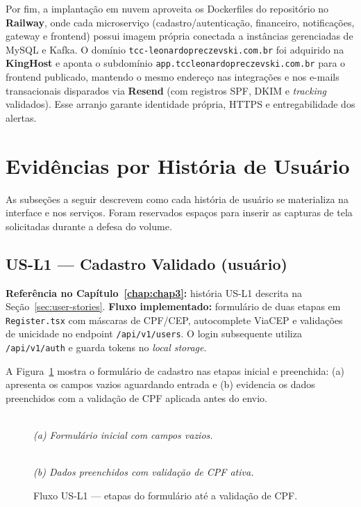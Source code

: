 Por fim, a implantação em nuvem aproveita os Dockerfiles do repositório no \textbf{Railway}, onde cada microserviço (cadastro/autenticação, financeiro, notificações, gateway e frontend) possui imagem própria conectada a instâncias gerenciadas de MySQL e Kafka. O domínio \texttt{tcc-leonardopreczevski.com.br} foi adquirido na \textbf{KingHost} e aponta o subdomínio \texttt{app.tcc\-leonardopreczevski.com.br} para o frontend publicado, mantendo o mesmo endereço nas integrações e nos e-mails transacionais disparados via \textbf{Resend} (com registros SPF, DKIM e \textit{tracking} validados). Esse arranjo garante identidade própria, HTTPS e entregabilidade dos alertas.

\section{Evidências por História de Usuário}

As subseções a seguir descrevem como cada história de usuário se materializa na interface e nos serviços. Foram reservados espaços para inserir as capturas de tela solicitadas durante a defesa do volume.

\subsection{US-L1 — Cadastro Validado (usuário)}
\textbf{Referência no Capítulo~\ref{chap:chap3}:} história US-L1 descrita na Seção~\ref{sec:user-stories}.
\textbf{Fluxo implementado:} formulário de duas etapas em \texttt{Register.tsx} com máscaras de CPF/CEP, autocomplete ViaCEP e validações de unicidade no endpoint \texttt{/api/v1/users}. O login subsequente utiliza \texttt{/api/v1/auth} e guarda tokens no \textit{local storage}.

A Figura~\ref{fig:us-l1a} mostra o formulário de cadastro nas etapas inicial e preenchida: (a) apresenta os campos vazios aguardando entrada e (b) evidencia os dados preenchidos com a validação de CPF aplicada antes do envio.

\begin{figure}[!htbp]
\centering
{}\\
\smallskip
\textit{(a) Formulário inicial com campos vazios.}

\par\medskip

\\
\smallskip
\textit{(b) Dados preenchidos com validação de CPF ativa.}
\caption{Fluxo US-L1 — etapas do formulário até a validação de CPF.}
\label{fig:us-l1a}
\end{figure}

